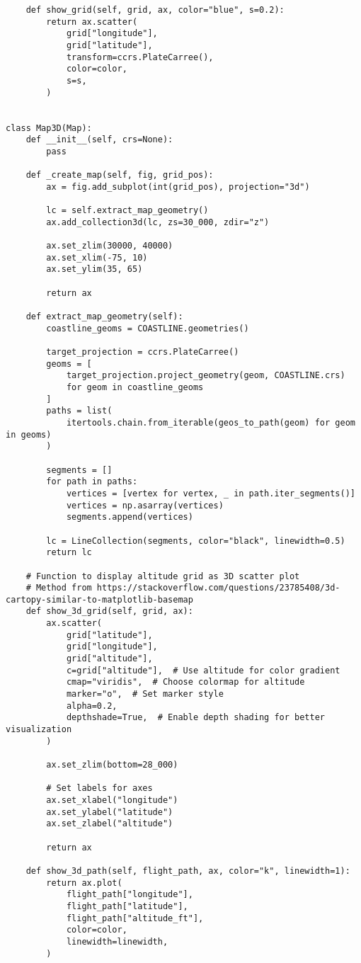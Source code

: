 \begin{verbatim}
    def show_grid(self, grid, ax, color="blue", s=0.2):
        return ax.scatter(
            grid["longitude"],
            grid["latitude"],
            transform=ccrs.PlateCarree(),
            color=color,
            s=s,
        )


class Map3D(Map):
    def __init__(self, crs=None):
        pass

    def _create_map(self, fig, grid_pos):
        ax = fig.add_subplot(int(grid_pos), projection="3d")

        lc = self.extract_map_geometry()
        ax.add_collection3d(lc, zs=30_000, zdir="z")

        ax.set_zlim(30000, 40000)
        ax.set_xlim(-75, 10)
        ax.set_ylim(35, 65)

        return ax

    def extract_map_geometry(self):
        coastline_geoms = COASTLINE.geometries()

        target_projection = ccrs.PlateCarree()
        geoms = [
            target_projection.project_geometry(geom, COASTLINE.crs)
            for geom in coastline_geoms
        ]
        paths = list(
            itertools.chain.from_iterable(geos_to_path(geom) for geom in geoms)
        )

        segments = []
        for path in paths:
            vertices = [vertex for vertex, _ in path.iter_segments()]
            vertices = np.asarray(vertices)
            segments.append(vertices)

        lc = LineCollection(segments, color="black", linewidth=0.5)
        return lc

    # Function to display altitude grid as 3D scatter plot
    # Method from https://stackoverflow.com/questions/23785408/3d-cartopy-similar-to-matplotlib-basemap
    def show_3d_grid(self, grid, ax):
        ax.scatter(
            grid["latitude"],
            grid["longitude"],
            grid["altitude"],
            c=grid["altitude"],  # Use altitude for color gradient
            cmap="viridis",  # Choose colormap for altitude
            marker="o",  # Set marker style
            alpha=0.2,
            depthshade=True,  # Enable depth shading for better visualization
        )

        ax.set_zlim(bottom=28_000)

        # Set labels for axes
        ax.set_xlabel("longitude")
        ax.set_ylabel("latitude")
        ax.set_zlabel("altitude")

        return ax

    def show_3d_path(self, flight_path, ax, color="k", linewidth=1):
        return ax.plot(
            flight_path["longitude"],
            flight_path["latitude"],
            flight_path["altitude_ft"],
            color=color,
            linewidth=linewidth,
        )

\end{verbatim}
